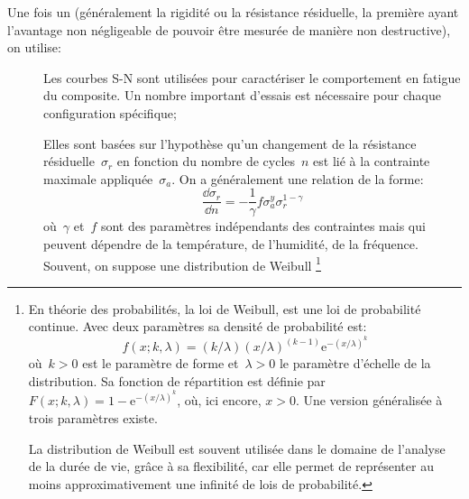 Une fois un  (généralement la rigidité ou la résistance résiduelle, la première ayant l'avantage non négligeable de pouvoir être mesurée de manière non destructive), on utilise:
\begin{description}
  \item[] Les courbes S-N sont utilisées
     pour caractériser le comportement en fatigue du composite.
     Un nombre important d'essais est nécessaire pour chaque
     configuration spécifique;

  \item[]
     Elles sont basées sur l'hypothèse qu'un changement de la
     résistance résiduelle~$\sigma_r$ en fonction du nombre de
     cycles~$n$ est lié à la contrainte maximale appliquée~$\sigma_a$.
     On a généralement une relation de la forme:
     \begin{equation}
      \dfrac{\dd \sigma_r}{\dd n} = -\dfrac1\gamma f\sigma_a^y
      \sigma_r^{1-\gamma}
     \end{equation}
     où~$\gamma$ et~$f$ sont des paramètres indépendants des
     contraintes mais qui peuvent dépendre de la température, de
     l'humidité, de la fréquence.
     Souvent, on suppose une distribution
    de Weibull
\footnote{En théorie des probabilités, la loi de Weibull, est une loi de probabilité continue. Avec deux paramètres sa densité de probabilité est:
\begin{equation*}  f(x;k,\lambda) = (k/\lambda) (x/\lambda)^{(k-1)} \mathrm{e}^{-(x/\lambda)^k}\end{equation*}
où~$k > 0$ est le paramètre de forme et~$\lambda > 0$ le paramètre
d'échelle de la distribution.
Sa fonction de répartition est définie par
$  F(x;k,\lambda) = 1- \mathrm{e}^{-(x/\lambda)^k}$,
où, ici encore, $x > 0$.
\medskipvm
Une version généralisée à trois paramètres existe.

\medskip
La distribution de Weibull est souvent utilisée dans le domaine de l'analyse de la durée de vie, grâce à sa flexibilité, car elle permet de représenter au moins approximativement une infinité de lois de probabilité.

}
\end{description}
